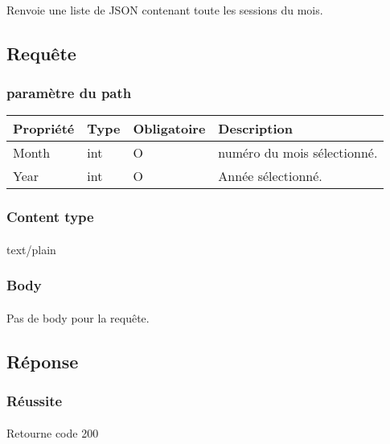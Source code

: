\paragraph{}
	Renvoie une liste de JSON contenant toute les sessions du mois.

\subsection{Requête}
	\subsubsection{paramètre du path}
		\begin{center}
			\begin{tabularx}{\textwidth}{| T{0.2122\textwidth} | S{0.22\textwidth} | S{0.15\textwidth} | S{0.3\textwidth} |}
				\hline
				Propriété & Type & Obligatoire & Description \\
				\hline
				Month & int & O & numéro du mois sélectionné. \\
				\hline
				Year & int & O & Année sélectionné. \\
				\hline
			\end{tabularx}
		\end{center}
		
	\subsubsection{Content type}
		\paragraph{}
			text/plain
			
	\subsubsection{Body}
		\paragraph{}
			Pas de body pour la requête.

\subsection{Réponse}
	\subsubsection{Réussite}
		\paragraph{}
			Retourne code 200
			
